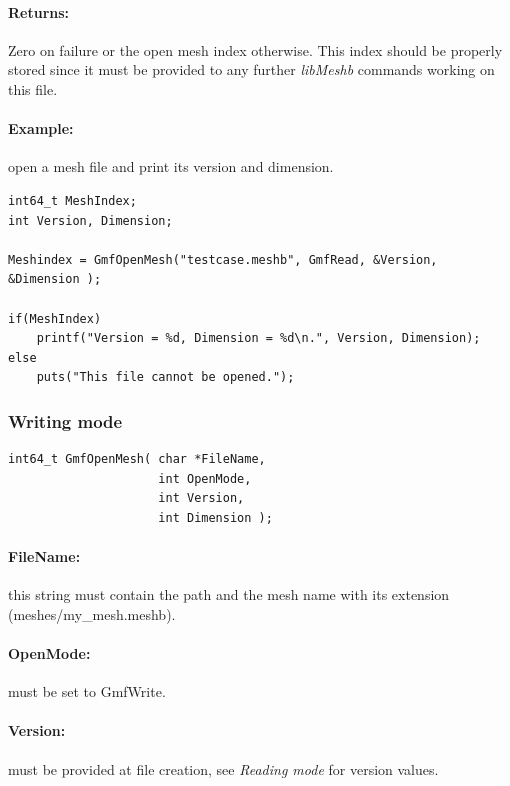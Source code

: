 \documentclass[a4paper,12pt]{article}
\begin{document}
\paragraph{Returns:}
Zero on failure or the open mesh index otherwise. This index should be properly stored since it must be provided to any further \emph{libMeshb} commands working on this file.

\paragraph{Example:} open a mesh file and print its version and dimension.

\begin{tt}
\begin{verbatim}
int64_t MeshIndex;
int Version, Dimension;

Meshindex = GmfOpenMesh("testcase.meshb", GmfRead, &Version, &Dimension );

if(MeshIndex)
    printf("Version = %d, Dimension = %d\n.", Version, Dimension);
else
    puts("This file cannot be opened.");
\end{verbatim}
\end{tt}
\normalfont


\subsubsection{Writing mode}
\begin{tt}
\begin{verbatim}
int64_t GmfOpenMesh( char *FileName,
                     int OpenMode,
                     int Version,
                     int Dimension );
\end{verbatim}
\end{tt}
\normalfont

\paragraph{FileName:}
this string must contain the path and the mesh name with its extension (meshes/my\_mesh.meshb).

\paragraph{OpenMode:}
must be set to GmfWrite.

\paragraph{Version:}
must be provided at file creation, see \emph{Reading mode} for version values.
\end{document}
